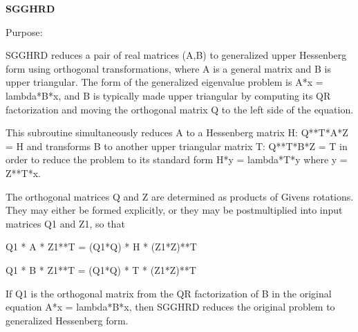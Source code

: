 {\bfseries S\+G\+G\+H\+R\+D} 

 \begin{DoxyParagraph}{Purpose\+: }
\begin{DoxyVerb} SGGHRD reduces a pair of real matrices (A,B) to generalized upper
 Hessenberg form using orthogonal transformations, where A is a
 general matrix and B is upper triangular.  The form of the
 generalized eigenvalue problem is
    A*x = lambda*B*x,
 and B is typically made upper triangular by computing its QR
 factorization and moving the orthogonal matrix Q to the left side
 of the equation.

 This subroutine simultaneously reduces A to a Hessenberg matrix H:
    Q**T*A*Z = H
 and transforms B to another upper triangular matrix T:
    Q**T*B*Z = T
 in order to reduce the problem to its standard form
    H*y = lambda*T*y
 where y = Z**T*x.

 The orthogonal matrices Q and Z are determined as products of Givens
 rotations.  They may either be formed explicitly, or they may be
 postmultiplied into input matrices Q1 and Z1, so that

      Q1 * A * Z1**T = (Q1*Q) * H * (Z1*Z)**T

      Q1 * B * Z1**T = (Q1*Q) * T * (Z1*Z)**T

 If Q1 is the orthogonal matrix from the QR factorization of B in the
 original equation A*x = lambda*B*x, then SGGHRD reduces the original
 problem to generalized Hessenberg form.\end{DoxyVerb}
 
\end{DoxyParagraph}

